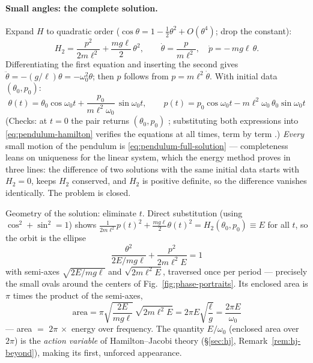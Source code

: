 \documentclass[11pt]{article}
\theoremstyle{plain}
\theoremstyle{definition}
\theoremstyle{remark}
\begin{document}
\paragraph{Small angles: the complete solution.}
Expand $H$ to quadratic order ($\cos\theta = 1 - \tfrac12\theta^2 +
O(\theta^4)$; drop the constant):
\begin{equation}
  H_2 = \frac{p^2}{2m\ell^2} + \frac{mg\ell}{2}\,\theta^2 ,
  \qquad
  \dot\theta = \frac{p}{m\ell^2},
  \quad
  \dot p = -\,mg\ell\,\theta .
\end{equation}
Differentiating the first equation and inserting the second gives
$\ddot\theta = -(g/\ell)\theta = -\omega_0^2\theta$; then $p$ follows
from $p = m\ell^2\dot\theta$. With initial data $(\theta_0, p_0)$:
\begin{equation}
  \boxed{\;
  \theta(t) = \theta_0\cos\omega_0 t
    + \frac{p_0}{m\ell^2\omega_0}\,\sin\omega_0 t,
  \qquad
  p(t) = p_0\cos\omega_0 t - m\ell^2\omega_0\,\theta_0\sin\omega_0 t
  \;}
  \label{eq:pendulum-full-solution}
\end{equation}
(Checks: at $t=0$ the pair returns $(\theta_0, p_0)$ \checkmark;
substituting both expressions into \eqref{eq:pendulum-hamilton} verifies
the equations at all times, term by term \checkmark.) \emph{Every} small
motion of the pendulum is \eqref{eq:pendulum-full-solution} ---
completeness leans on uniqueness for the linear system, which the
energy method proves in three lines: the difference of two solutions
with the same initial data starts with $H_2 = 0$, keeps $H_2$
conserved, and $H_2$ is positive definite, so the difference vanishes
identically. The problem is closed.

Geometry of the solution: eliminate $t$. Direct substitution (using
$\cos^2 + \sin^2 = 1$) shows
$\tfrac{1}{2m\ell^2}p(t)^2 + \tfrac{mg\ell}{2}\theta(t)^2
= H_2(\theta_0, p_0) \equiv E$ for all $t$, so the orbit is the ellipse
\begin{equation}
  \frac{\theta^2}{2E/mg\ell} + \frac{p^2}{2m\ell^2 E} = 1
\end{equation}
with semi-axes $\sqrt{2E/mg\ell}$ and $\sqrt{2m\ell^2E}$, traversed once
per period --- precisely the small ovals around the centers of
Fig.~\ref{fig:phase-portraits}. Its enclosed area is $\pi$ times the
product of the semi-axes,
\begin{equation}
  \text{area}
  = \pi\sqrt{\frac{2E}{mg\ell}}\,\sqrt{2m\ell^2 E}
  = 2\pi E\sqrt{\frac{\ell}{g}}
  = \frac{2\pi E}{\omega_0}
\end{equation}
--- area $=$ $2\pi\,\times$ energy over frequency. The quantity
$E/\omega_0$ (enclosed area over $2\pi$) is the \emph{action variable} of
Hamilton--Jacobi theory (\S\ref{sec:hj}, Remark~\ref{rem:hj-beyond}),
making its first, unforced appearance.
\end{document}
